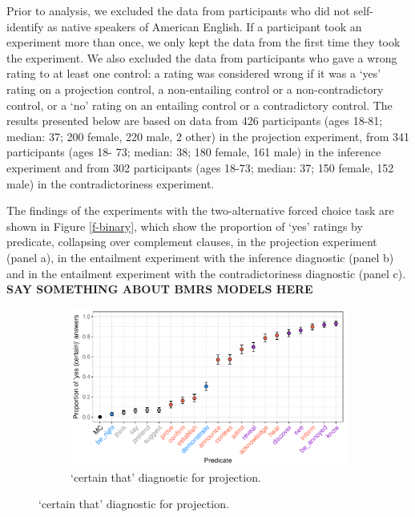 \documentclass[11pt,fleqn]{article}
\newcommand{\6}{\mbox{$[\hspace*{-.6mm}[$}}
\newcommand{\9}{\mbox{$]\hspace*{-.6mm}]$}}
\begin{document}
{Prior to analysis, we excluded the data from participants who did not self-identify as native speakers of American English. If a participant took an experiment more than once, we only kept the data from the first time they took the experiment. We also excluded the data from participants who gave a wrong rating to at least one control: a rating was considered wrong if it was a `yes' rating on a projection control, a non-entailing control or a non-contradictory control, or a `no' rating on an entailing control or a contradictory control. The results presented below are based on data from 426 participants (ages 18-81; median: 37; 200 female, 220 male, 2 other) in the projection experiment, from 341 participants (ages 18- 73; median: 38; 180 female, 161 male) in the inference experiment and from 302 participants (ages 18-73; median: 37; 150 female, 152 male) in the contradictoriness experiment.

The findings of the experiments with the two-alternative forced choice task are shown in Figure \ref{f-binary}, which show the proportion of `yes' ratings by predicate, collapsing over complement clauses, in the projection experiment (panel a), in the entailment experiment with the inference diagnostic (panel b) and in the entailment experiment with the contradictoriness diagnostic (panel c). {\bf SAY SOMETHING ABOUT BMRS MODELS HERE}

\begin{figure}[H]
\centering

\begin{subfigure}{1\textwidth}
\centering
\includegraphics[width=.5\paperwidth]{../results/8-projectivity-no-fact-binary/graphs/proportion-by-predicate-variability}
\caption{`certain that' diagnostic for projection.}
\end{subfigure}


\end{figure}}
\end{document}
